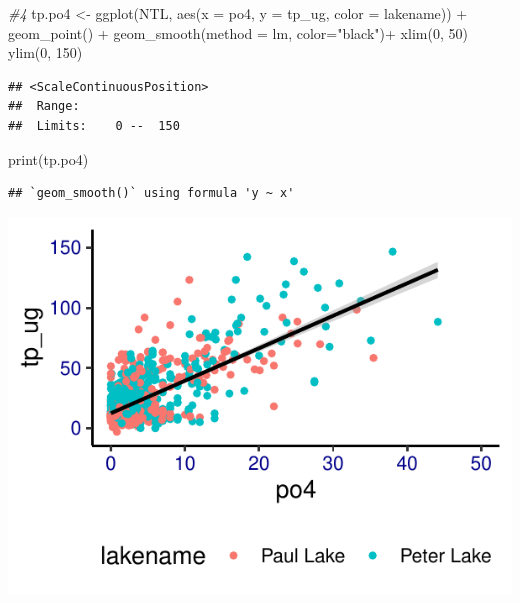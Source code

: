 \documentclass[]{article}
\newenvironment{Shaded}{\begin{snugshade}}{\end{snugshade}}
\newcommand{\AttributeTok}[1]{\textcolor[rgb]{0.77,0.63,0.00}{#1}}
\newcommand{\CommentTok}[1]{\textcolor[rgb]{0.56,0.35,0.01}{\textit{#1}}}
\newcommand{\DecValTok}[1]{\textcolor[rgb]{0.00,0.00,0.81}{#1}}
\newcommand{\FunctionTok}[1]{\textcolor[rgb]{0.00,0.00,0.00}{#1}}
\newcommand{\NormalTok}[1]{#1}
\newcommand{\OtherTok}[1]{\textcolor[rgb]{0.56,0.35,0.01}{#1}}
\newcommand{\SpecialCharTok}[1]{\textcolor[rgb]{0.00,0.00,0.00}{#1}}
\newcommand{\StringTok}[1]{\textcolor[rgb]{0.31,0.60,0.02}{#1}}
\begin{document}
\begin{Shaded}
\begin{Highlighting}[]
\CommentTok{\#4}
\NormalTok{tp.po4 }\OtherTok{\textless{}{-}}
  \FunctionTok{ggplot}\NormalTok{(NTL, }\FunctionTok{aes}\NormalTok{(}\AttributeTok{x =}\NormalTok{ po4, }\AttributeTok{y =}\NormalTok{ tp\_ug, }\AttributeTok{color =}\NormalTok{ lakename)) }\SpecialCharTok{+}
  \FunctionTok{geom\_point}\NormalTok{() }\SpecialCharTok{+}
  \FunctionTok{geom\_smooth}\NormalTok{(}\AttributeTok{method =}\NormalTok{ lm, }\AttributeTok{color=}\StringTok{"black"}\NormalTok{)}\SpecialCharTok{+}
  \FunctionTok{xlim}\NormalTok{(}\DecValTok{0}\NormalTok{, }\DecValTok{50}\NormalTok{) }
  \FunctionTok{ylim}\NormalTok{(}\DecValTok{0}\NormalTok{, }\DecValTok{150}\NormalTok{)}
\end{Highlighting}
\end{Shaded}

\begin{verbatim}
## <ScaleContinuousPosition>
##  Range:  
##  Limits:    0 --  150
\end{verbatim}

\begin{Shaded}
\begin{Highlighting}[]
\FunctionTok{print}\NormalTok{(tp.po4)}
\end{Highlighting}
\end{Shaded}

\begin{verbatim}
## `geom_smooth()` using formula 'y ~ x'
\end{verbatim}

\includegraphics{A05_DataVisualization_files/figure-latex/unnamed-chunk-4-1.pdf}
\end{document}
